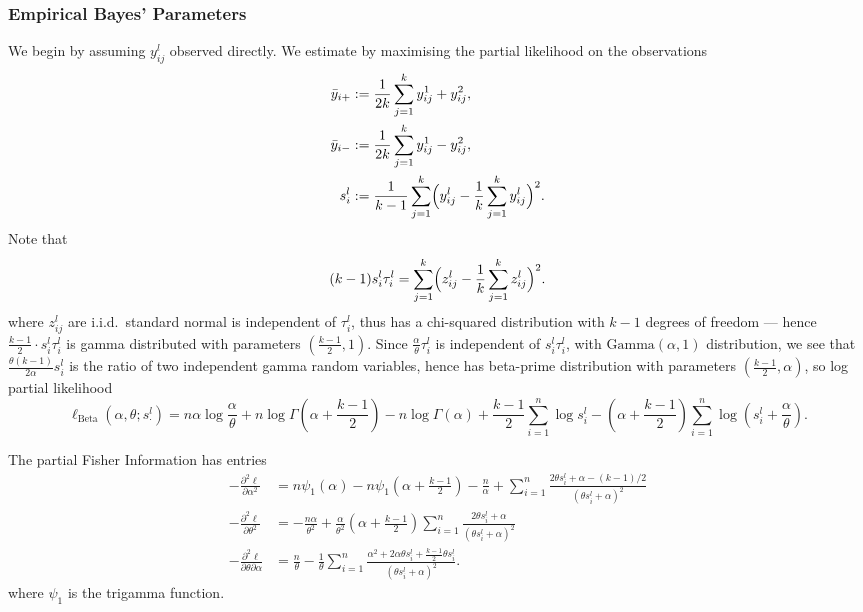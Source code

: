 \documentclass[
]{article}
\begin{document}
\hypertarget{empirical-bayes-parameters}{%
\subsubsection{Empirical Bayes'
Parameters}\label{empirical-bayes-parameters}}

We begin by assuming \(y_{ij}^l\) observed directly. We estimate by
maximising the partial likelihood on the observations \begin{align*}
  \bar{y}_{i+}&:= \frac{1}{2k} \sum_{j=1}^k y_{ij}^1 + y_{ij}^2,\\
  \bar{y}_{i-}&:= \frac{1}{2k} \sum_{j=1}^k y_{ij}^1 - y_{ij}^2,\\
  s_i^l&:=  \frac{1}{k-1}\sum_{j=1}^k \Bigl( y_{ij}^l - \frac{1}{k} \sum_{j=1}^k y_{ij}^l \Bigr)^2.
\end{align*} Note that \begin{equation}
(k-1)s_i^l \tau_i^l =\sum_{j=1}^k \Bigl( z_{ij}^l - \frac{1}{k} \sum_{j=1}^k z_{ij}^l \Bigr)^2.
\end{equation} where \(z_{ij}^l\) are i.i.d.~standard normal is
independent of \(\tau_i^l\), thus has a chi-squared distribution with
\(k-1\) degrees of freedom --- hence
\(\frac{k-1}{2}\cdot s_i^l\tau_i^l\) is gamma distributed with
parameters \((\frac{k-1}{2},1)\). Since
\(\frac{\alpha}{\theta}\tau_i^l\) is independent of \(s_i^l\tau_i^l\),
with \(\mathrm{Gamma}(\alpha,1)\) distribution, we see that
\(\frac{\theta(k-1)}{2\alpha}s_i^l\) is the ratio of two independent
gamma random variables, hence has beta-prime distribution with
parameters \(\left(\frac{k-1}{2}, \alpha \right)\), so log partial
likelihood \begin{equation}
  \ell_{\operatorname{Beta}}(\alpha,\theta;s^l_\cdot)=n\alpha \log\frac{\alpha}{\theta}+n\log\Gamma\left(\alpha+\frac{k-1}{2}\right)-n\log\Gamma(\alpha)
  + \frac{k-1}{2} \sum_{i=1}^n \log s_i^l -\left(\alpha+\frac{k-1}{2}\right) \sum_{i=1}^n \log \left(s_i^l+\frac\alpha\theta\right).
\end{equation}

The partial Fisher Information has entries \begin{align*}
 -\frac{\partial^2 \ell}{\partial \alpha^2} &= n\psi_1\left(\alpha\right) - n\psi_1\left(\alpha+\frac{k-1}{2}\right)
  - \frac{n}{\alpha} +\sum_{i=1}^n \frac{2\theta s_i^l + \alpha-(k-1)/2}{(\theta s_i^l + \alpha)^2}\\
-\frac{\partial^2 \ell}{\partial \theta^2} &=
   -\frac{n \alpha}{\theta^2} +\frac{\alpha}{\theta^2}\left(\alpha+\frac{k-1}{2}\right)\sum_{i=1}^n \frac{2\theta s_i^l + \alpha}{(\theta s_i^l + \alpha)^2}\\
-\frac{\partial^2 \ell}{\partial \theta\partial\alpha} &= \frac{n}{\theta}-
   \frac1\theta \sum_{i=1}^n \frac{\alpha^2+2\alpha\theta s_i^l+\frac{k-1}{2}\theta s_i^l}{(\theta s_i^l + \alpha)^2}.
\end{align*} where \(\psi_1\) is the trigamma function.
\end{document}
